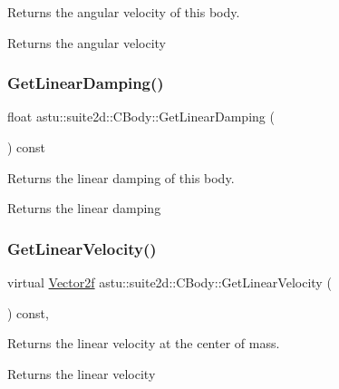 Returns the angular velocity of this body.

\begin{DoxyReturn}{Returns}
the angular velocity 
\end{DoxyReturn}
\mbox{\label{classastu_1_1suite2d_1_1CBody_ac76f056ff08398c9057563e0d67a5f00}} 
\subsubsection{\texorpdfstring{Get\+Linear\+Damping()}{GetLinearDamping()}}
{\footnotesize\ttfamily float astu\+::suite2d\+::\+C\+Body\+::\+Get\+Linear\+Damping (\begin{DoxyParamCaption}{ }\end{DoxyParamCaption}) const\hspace{0.3cm}{\ttfamily [inline]}}

Returns the linear damping of this body.

\begin{DoxyReturn}{Returns}
the linear damping 
\end{DoxyReturn}
\mbox{\label{classastu_1_1suite2d_1_1CBody_a210a80c6f3e024b98dd367a35415cc86}} 
\subsubsection{\texorpdfstring{Get\+Linear\+Velocity()}{GetLinearVelocity()}}
{\footnotesize\ttfamily virtual \hyperlink{classastu_1_1Vector2}{Vector2f} astu\+::suite2d\+::\+C\+Body\+::\+Get\+Linear\+Velocity (\begin{DoxyParamCaption}{ }\end{DoxyParamCaption}) const\hspace{0.3cm}{\ttfamily [inline]}, {\ttfamily [virtual]}}

Returns the linear velocity at the center of mass.

\begin{DoxyReturn}{Returns}
the linear velocity 
\end{DoxyReturn}
\mbox{\label{classastu_1_1suite2d_1_1CBody_a76733d539daf6c60c595586bc72db5b7}} 
